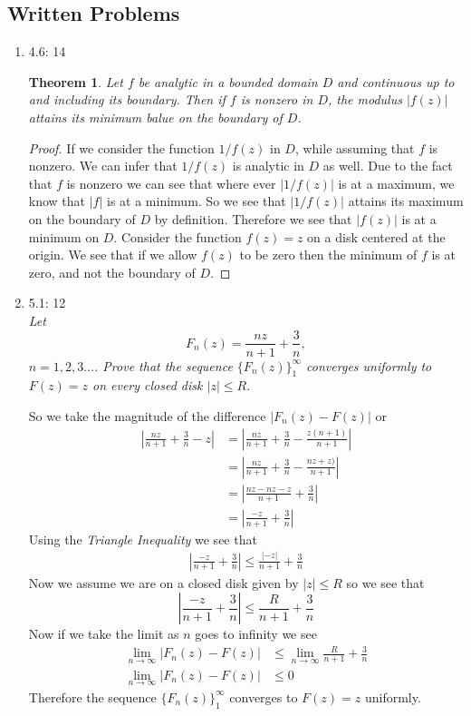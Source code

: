 \documentclass[11pt]{article}
\begin{document}

\subsection*{Written Problems}
\begin{enumerate}
\item 4.6: 14\\
\newtheorem{Theo14}{Theorem}
\begin{Theo14}
Let $f$ be analytic in a bounded domain $D$ and continuous up to and including its boundary. Then if $f$ is nonzero in $D$, the modulus $|f(z)|$ attains its minimum balue on the boundary of $D$.
\end{Theo14}
\begin{proof}
If we consider the function $1/f(z)$ in $D$, while assuming that $f$ is nonzero. We can infer that $1/f(z)$ is analytic in $D$ as well. Due to the fact that $f$ is nonzero we can see that where ever $|1/f(z)|$ is at a maximum, we know that $|f|$ is at a minimum. So we see that $|1/f(z)|$ attains its maximum on the boundary of $D$ by definition. Therefore we see that $|f(z)|$ is at a minimum on $D$. Consider the function $f(z) = z$ on a disk centered at the origin. We see that if we allow $f(z)$ to be zero then the minimum of $f$ is at zero, and not the boundary of $D$.
\end{proof}

\item 5.1: 12\\
\textit{Let 
$$F_n(z) = \frac{nz}{n+1}+\frac{3}{n},$$
$n=1,2,3...$. Prove that the sequence $\{F_n(z)\}_1^{\infty}$ converges uniformly to $F(z) = z$ on every closed disk $|z|\le R$.}

So we take the magnitude of the difference $|F_n(z) - F(z)|$ or
\begin{align*}
\left|\frac{nz}{n+1}+\frac{3}{n} - z\right| &= \left|\frac{nz}{n+1}+\frac{3}{n} - \frac{z(n+1)}{n+1}\right|\\
&= \left|\frac{nz}{n+1}+\frac{3}{n} - \frac{nz+z)}{n+1}\right|\\
&= \left|\frac{nz-nz-z}{n+1}+\frac{3}{n}\right|\\
&= \left|\frac{-z}{n+1}+\frac{3}{n}\right|
\end{align*}
Using the \emph{Triangle Inequality} we see that
\begin{align*}
\left|\frac{-z}{n+1}+\frac{3}{n}\right| \le \frac{|-z|}{n+1}+\frac{3}{n} 
\end{align*}
Now we assume we are on a closed disk given by $|z|\le R$ so we see that
$$\left|\frac{-z}{n+1}+\frac{3}{n}\right| \le \frac{R}{n+1}+\frac{3}{n}$$
Now if we take the limit as $n$ goes to infinity we see
\begin{align*}
\lim_{n\rightarrow\infty} \left|F_n(z) - F(z)\right| &\le \lim_{n\rightarrow\infty} \frac{R}{n+1}+\frac{3}{n}\\
\lim_{n\rightarrow\infty} \left|F_n(z) - F(z)\right| &\le 0
\end{align*}
Therefore the sequence $\{F_n(z)\}_1^{\infty}$ converges to $F(z) = z$ uniformly.

\end{enumerate}
\end{document}
